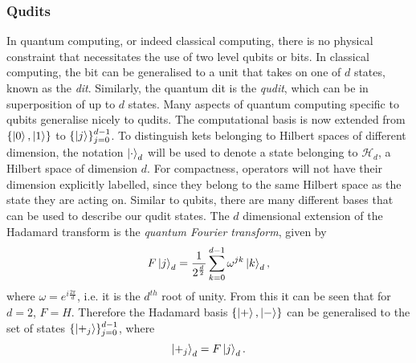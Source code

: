 \subsubsection{Qudits}
\label{subsubsection:qudits}
In quantum computing, or indeed classical computing, there is no physical constraint that necessitates the use of two level qubits or bits.
In classical computing, the bit can be generalised to a unit that takes on one of $d$ states, known as the \emph{dit}.
Similarly, the quantum dit is the \emph{qudit}, which can be in superposition of up to $d$ states.
Many aspects of quantum computing specific to qubits generalise nicely to qudits.
The computational basis is now extended from $\{\ket{0}, \ket{1}\}$ to $\{\ket{j}\}_{j=0}^{d-1}$.
To distinguish kets belonging to Hilbert spaces of different dimension, the notation $\ket{\cdot}_d$ will be used to denote a state belonging to $\mathcal{H}_d$, a Hilbert space of dimension $d$.
For compactness, operators will not have their dimension explicitly labelled, since they belong to the same Hilbert space as the state they are acting on.
Similar to qubits, there are many different bases that can be used to describe our qudit states.
The $d$ dimensional extension of the Hadamard transform is the \emph{quantum Fourier transform}, given by
\begin{equation}
    F\ket{j}_d = \frac{1}{2^{\frac{d}{2}}} \sum_{k=0}^{d-1} \omega^{jk}\ket{k}_d,
\end{equation}
where $\omega = e^{i\frac{2\pi}{d}}$, i.e. it is the $d^{th}$ root of unity.
From this it can be seen that for $d = 2$, $F = H$.
Therefore the Hadamard basis $\{\ket{+}, \ket{-}\}$ can be generalised to the set of states  $\{\ket{+_j}\}_{j=0}^{d-1}$, where
\begin{equation}
    \ket{+_j}_d = F\ket{j}_d.
\end{equation}

